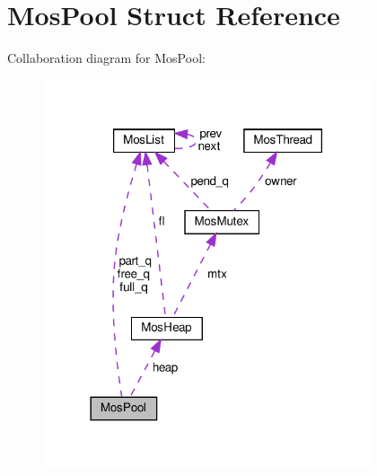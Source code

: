 \hypertarget{structMosPool}{}\section{Mos\+Pool Struct Reference}
\label{structMosPool}


Collaboration diagram for Mos\+Pool\+:\nopagebreak
\begin{figure}[H]
\begin{center}
\leavevmode
\includegraphics[width=273pt]{structMosPool__coll__graph}
\end{center}
\end{figure}
